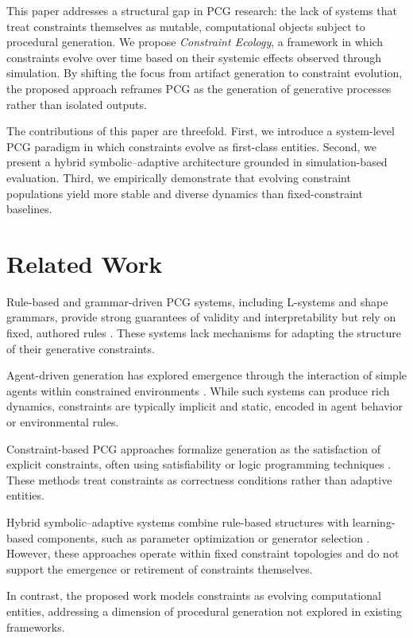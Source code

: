 \documentclass[11pt]{article}
\begin{document}
This paper addresses a structural gap in PCG research: the lack of systems that treat constraints themselves as mutable, computational objects subject to procedural generation. We propose \emph{Constraint Ecology}, a framework in which constraints evolve over time based on their systemic effects observed through simulation. By shifting the focus from artifact generation to constraint evolution, the proposed approach reframes PCG as the generation of generative processes rather than isolated outputs.

The contributions of this paper are threefold. First, we introduce a system-level PCG paradigm in which constraints evolve as first-class entities. Second, we present a hybrid symbolic--adaptive architecture grounded in simulation-based evaluation. Third, we empirically demonstrate that evolving constraint populations yield more stable and diverse dynamics than fixed-constraint baselines.

\section{Related Work}

Rule-based and grammar-driven PCG systems, including L-systems and shape grammars, provide strong guarantees of validity and interpretability but rely on fixed, authored rules \cite{pcg2}. These systems lack mechanisms for adapting the structure of their generative constraints.

Agent-driven generation has explored emergence through the interaction of simple agents within constrained environments \cite{pcg3}. While such systems can produce rich dynamics, constraints are typically implicit and static, encoded in agent behavior or environmental rules.

Constraint-based PCG approaches formalize generation as the satisfaction of explicit constraints, often using satisfiability or logic programming techniques \cite{pcg4}. These methods treat constraints as correctness conditions rather than adaptive entities.

Hybrid symbolic--adaptive systems combine rule-based structures with learning-based components, such as parameter optimization or generator selection \cite{pcg5}. However, these approaches operate within fixed constraint topologies and do not support the emergence or retirement of constraints themselves.

In contrast, the proposed work models constraints as evolving computational entities, addressing a dimension of procedural generation not explored in existing frameworks.
\end{document}
